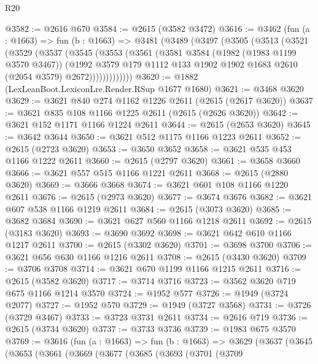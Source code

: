 \begin{lexlean}{R20}
\begin{coremodule}
@3582 := @2616 @670
@3584 := @2615 (@3582 @3472)
@3616 := @3462
    (fun (a : @1663) =>
    fun (b : @1663) =>
    @3481
      (@3489
        (@3497
          (@3505
            (@3513
              (@3521
                (@3529
                  (@3537
                    (@3545
                      (@3553
                        (@3561
                          (@3581
                            @3584
                            (@1982 (@1983 @1199 @3570 @3467))
                            (@1992
                              @3579
                              @179
                              @1112
                              @133
                              @1902
                              @1902
                              @1683
                              @2610
                              (@2054 @3579)
                              @2672)))))))))))))
@3620 := @1882 (LexLeanBoot.LexiconLre.Render.RSup @1677 @1680)
@3621 := @3468 @3620
@3629 := @3621 @840 @274 @1162 @1226 @2611 (@2615 (@2617 @3620))
@3637 := @3621 @835 @108 @1166 @1225 @2611 (@2615 (@2626 @3620))
@3642 := @3621 @152 @1171 @1166 @1224 @2611
@3644 := @2615 (@2653 @3620)
@3645 := @3642 @3644
@3650 := @3621 @512 @1175 @1166 @1223 @2611
@3652 := @2615 (@2723 @3620)
@3653 := @3650 @3652
@3658 := @3621 @535 @453 @1166 @1222 @2611
@3660 := @2615 (@2797 @3620)
@3661 := @3658 @3660
@3666 := @3621 @557 @515 @1166 @1221 @2611
@3668 := @2615 (@2880 @3620)
@3669 := @3666 @3668
@3674 := @3621 @601 @108 @1166 @1220 @2611
@3676 := @2615 (@2973 @3620)
@3677 := @3674 @3676
@3682 := @3621 @607 @538 @1166 @1219 @2611
@3684 := @2615 (@3073 @3620)
@3685 := @3682 @3684
@3690 := @3621 @627 @560 @1166 @1218 @2611
@3692 := @2615 (@3183 @3620)
@3693 := @3690 @3692
@3698 := @3621 @642 @610 @1166 @1217 @2611
@3700 := @2615 (@3302 @3620)
@3701 := @3698 @3700
@3706 := @3621 @656 @630 @1166 @1216 @2611
@3708 := @2615 (@3430 @3620)
@3709 := @3706 @3708
@3714 := @3621 @670 @1199 @1166 @1215 @2611
@3716 := @2615 (@3582 @3620)
@3717 := @3714 @3716
@3723 := @3562 @3620 @719 @675 @1166 @1214 @3570
@3724 := @1952 @577
@3726 := @1949 (@3724 @2077)
@3727 := @1952 @570
@3729 := @1949 (@3727 @3568)
@3731 := @3726 (@3729 @3467)
@3733 := @3723 @3731 @2611
@3734 := @2616 @719
@3736 := @2615 (@3734 @3620)
@3737 := @3733 @3736
@3739 := @1983 @675 @3570
@3769 := @3616
    (fun (a : @1663) =>
    fun (b : @1663) =>
    @3629
      (@3637
        (@3645
          (@3653
            (@3661
              (@3669
                (@3677
                  (@3685
                    (@3693
                      (@3701
                        (@3709

\end{coremodule}
\end{lexlean}
